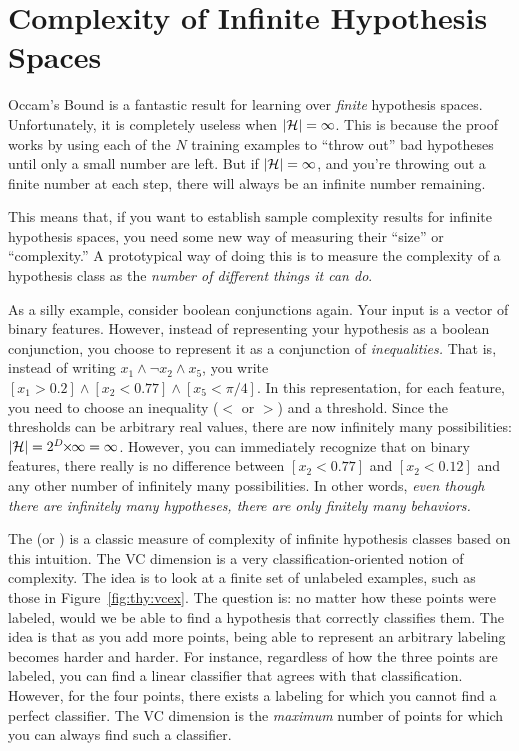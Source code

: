 \section{Complexity of Infinite Hypothesis Spaces}

Occam's Bound is a fantastic result for learning over \emph{finite}
hypothesis spaces.  Unfortunately, it is completely useless when
$\left\vert \mathcal{H} \right\vert = \infty$.  This is because the proof works by using each
of the $N$ training examples to ``throw out'' bad hypotheses until
only a small number are left.  But if $\left\vert \mathcal{H} \right\vert = \infty$, and
you're throwing out a finite number at each step, there will always be
an infinite number remaining.

This means that, if you want to establish sample complexity results
for infinite hypothesis spaces, you need some new way of measuring
their ``size'' or ``complexity.''  A prototypical way of doing this is
to measure the complexity of a hypothesis class as the \emph{number of
  different things it can do}.

As a silly example, consider boolean conjunctions again.  Your input
is a vector of binary features.  However, instead of representing your
hypothesis as a boolean conjunction, you choose to represent it as a
conjunction of \emph{inequalities.}  That is, instead of writing $x_1
\land \lnot x_2 \land x_5$, you write $[x_1 > 0.2] \land [x_2 < 0.77]
\land [x_5 < \pi/4]$.  In this representation, for each feature, you
need to choose an inequality ($<$ or $>$) and a threshold.  Since the
thresholds can be arbitrary real values, there are now infinitely many
possibilities: $\card{\cH} = 2^D \times \infty = \infty$.  However,
you can immediately recognize that on binary features, there really is
no difference between $[x_2 < 0.77]$ and $[x_2 < 0.12]$ and any other
number of infinitely many possibilities.  In other words, \emph{even
  though there are infinitely many hypotheses, there are only finitely
  many behaviors.}


The  (or ) is a classic measure of complexity of infinite
hypothesis classes based on this intuition.  The VC dimension is a very classification-oriented
notion of complexity.  The idea is to look at a finite set of
unlabeled examples, such as those in Figure~\ref{fig:thy:vcex}.  The
question is: no matter how these points were labeled, would we be able
to find a hypothesis that correctly classifies them.  The idea is that
as you add more points, being able to represent an arbitrary labeling
becomes harder and harder.  For instance, regardless of how the three
points are labeled, you can find a linear classifier that agrees with
that classification.  However, for the four points, there exists a
labeling for which you cannot find a perfect classifier.  The VC
dimension is the \emph{maximum} number of points for which you can
always find such a classifier.

